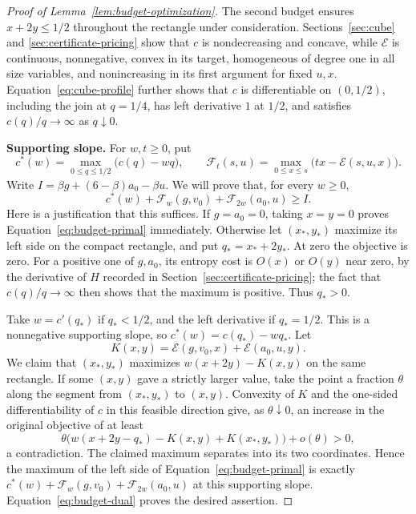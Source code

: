 \begin{proof}[Proof of Lemma~\ref{lem:budget-optimization}]
The second budget ensures \(x+2y\le1/2\) throughout the rectangle
under consideration. Sections~\ref{sec:cube} and
\ref{sec:certificate-pricing} show that \(c\) is nondecreasing and
concave, while \(\mathcal E\) is continuous, nonnegative, convex in its
target, homogeneous of degree one in all size variables, and
nonincreasing in its first argument for fixed \(u,x\).
Equation~\eqref{eq:cube-profile} further shows that \(c\) is
differentiable on \((0,1/2)\), including the join at \(q=1/4\), has
left derivative \(1\) at \(1/2\), and satisfies
\(c(q)/q\to\infty\) as \(q\downarrow0\).

\medskip\noindent\textbf{Supporting slope.}
For \(w,t\ge0\), put
\[
 c^*(w)=\max_{0\le q\le1/2}\bigl(c(q)-wq\bigr),\qquad
 \mathcal F_t(s,u)=\max_{0\le x\le s}
       \bigl(tx-\mathcal E(s,u,x)\bigr).
\]
Write \(I=\beta g+(6-\beta)a_0-\beta u\). We will prove that, for
every \(w\ge0\),
\begin{equation}\label{eq:budget-dual}
 c^*(w)+\mathcal F_w(g,v_0)+\mathcal F_{2w}(a_0,u)\ge I.
\end{equation}
Here is a justification that this suffices. If \(g=a_0=0\), taking
\(x=y=0\) proves Equation~\eqref{eq:budget-primal} immediately.
Otherwise let \((x_*,y_*)\) maximize its left side on the compact
rectangle, and put \(q_*=x_*+2y_*\). At zero the objective is zero.
For a positive one of \(g,a_0\), its entropy cost is \(O(x)\) or
\(O(y)\) near zero, by the derivative of \(H\) recorded in
Section~\ref{sec:certificate-pricing}; the fact that
\(c(q)/q\to\infty\) then shows that the maximum is positive.
Thus \(q_*>0\).

Take \(w=c'(q_*)\) if \(q_*<1/2\), and the left derivative if
\(q_*=1/2\). This is a nonnegative supporting slope, so
\(c^*(w)=c(q_*)-wq_*\). Let
\[
 K(x,y)=\mathcal E(g,v_0,x)+\mathcal E(a_0,u,y).
\]
We claim that \((x_*,y_*)\) maximizes \(w(x+2y)-K(x,y)\) on the
same rectangle. If some \((x,y)\) gave a strictly larger value, take
the point a fraction \(\theta\) along the segment from
\((x_*,y_*)\) to \((x,y)\). Convexity of \(K\) and the one-sided
differentiability of \(c\) in this feasible direction give, as
\(\theta\downarrow0\), an increase in the original objective of at
least
\[
 \theta\bigl(w(x+2y-q_*)-K(x,y)+K(x_*,y_*)\bigr)+o(\theta)>0,
\]
a contradiction. The claimed maximum separates into its two
coordinates. Hence the maximum of the left side of
Equation~\eqref{eq:budget-primal} is exactly
\(c^*(w)+\mathcal F_w(g,v_0)+\mathcal F_{2w}(a_0,u)\) at this
supporting slope. Equation~\eqref{eq:budget-dual} proves the desired
assertion.


\end{proof}
